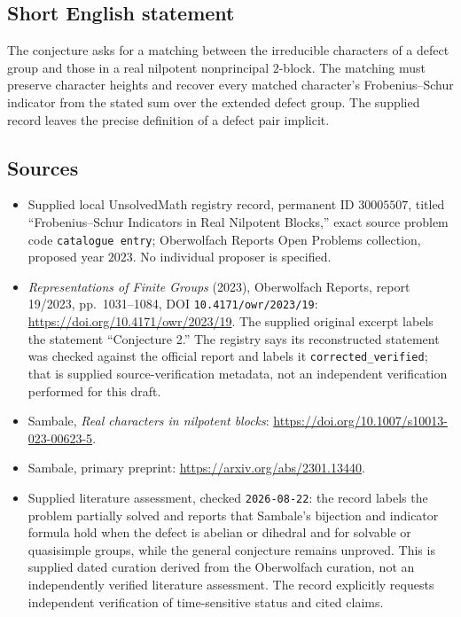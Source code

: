 \documentclass[11pt]{article}
\begin{document}
\subsection{Short English statement}
The conjecture asks for a matching between the irreducible characters of a defect group and those in a real nilpotent nonprincipal \(2\)-block. The matching must preserve character heights and recover every matched character's Frobenius--Schur indicator from the stated sum over the extended defect group. The supplied record leaves the precise definition of a defect pair implicit.
\subsection{Sources}
\begin{itemize}
\item Supplied local UnsolvedMath registry record, permanent ID \(30005507\), titled ``Frobenius--Schur Indicators in Real Nilpotent Blocks,'' exact source problem code \texttt{catalogue entry}; Oberwolfach Reports Open Problems collection, proposed year \(2023\). No individual proposer is specified.
\item \emph{Representations of Finite Groups} (2023), Oberwolfach Reports, report 19/2023, pp.\ 1031--1084, DOI \texttt{10.4171/owr/2023/19}: \url{https://doi.org/10.4171/owr/2023/19}. The supplied original excerpt labels the statement ``Conjecture 2.'' The registry says its reconstructed statement was checked against the official report and labels it \texttt{corrected\_verified}; that is supplied source-verification metadata, not an independent verification performed for this draft.
\item Sambale, \emph{Real characters in nilpotent blocks}: \url{https://doi.org/10.1007/s10013-023-00623-5}.
\item Sambale, primary preprint: \url{https://arxiv.org/abs/2301.13440}.
\item Supplied literature assessment, checked \texttt{2026-08-22}: the record labels the problem partially solved and reports that Sambale's bijection and indicator formula hold when the defect is abelian or dihedral and for solvable or quasisimple groups, while the general conjecture remains unproved. This is supplied dated curation derived from the Oberwolfach curation, not an independently verified literature assessment. The record explicitly requests independent verification of time-sensitive status and cited claims.
\end{itemize}
\end{document}
